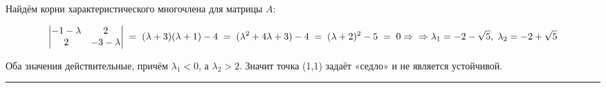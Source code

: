 \documentclass[11pt]{article}
\begin{document}
Найдём корни характеристического многочлена для матрицы \(A\):

\[
\begin{vmatrix}
-1-\lambda & 2\\
 2 & -3-\lambda
\end{vmatrix}
\; = \;
(\lambda+3)(\lambda+1)-4 \; = \; (\lambda^2+4\lambda+3)-4 \; = \; (\lambda+2)^2-5 \; = \; 0
\Rightarrow\\
\Rightarrow
  \lambda_{1}=-2-\sqrt{5}, \; \lambda_{2}=-2+\sqrt{5}
\]

Оба значения действительные, причём \(\lambda_{1}<0\), а
\(\lambda_{2}>2\). Значит точка (1,1) задаёт «седло» и не является
устойчивой.

\begin{center}\rule{0.5\linewidth}{0.5pt}\end{center}
\end{document}
